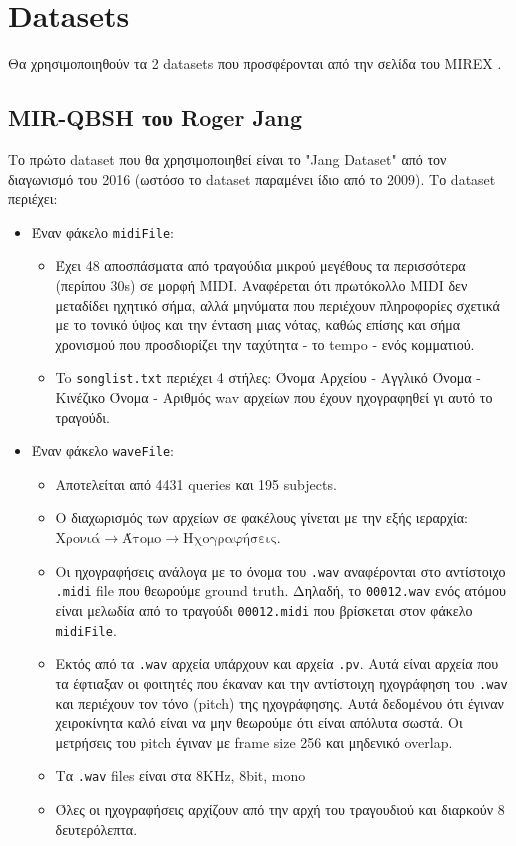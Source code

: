 \section{Datasets}

Θα χρησιμοποιηθούν τα 2 datasets που προσφέρονται από την σελίδα του MIREX \cite{mirex}.

\subsection{MIR-QBSH του Roger Jang}
Το πρώτο dataset που θα χρησιμοποιηθεί είναι το "Jang Dataset" \cite{jang-dataset} από τον διαγωνισμό του 2016 (ωστόσο το dataset παραμένει ίδιο από το 2009). Το dataset περιέχει:
\begin{itemize}
\item Έναν φάκελο \texttt{midiFile}:
\begin{itemize}
\item Έχει 48 αποσπάσματα από τραγούδια μικρού μεγέθους τα περισσότερα (περίπου 30s) σε μορφή MIDI\cite{midi1996complete}.
Αναφέρεται ότι πρωτόκολλο MIDI δεν μεταδίδει ηχητικό σήμα, αλλά μηνύματα που περιέχουν πληροφορίες σχετικά με το τονικό ύψος και την ένταση μιας νότας, καθώς επίσης και σήμα χρονισμού που προσδιορίζει την ταχύτητα - το tempo - ενός κομματιού.
\item To \texttt{songlist.txt} περιέχει 4 στήλες: Όνομα Αρχείου - Αγγλικό Όνομα - Κινέζικο Όνομα - Αριθμός wav αρχείων που έχουν ηχογραφηθεί γι αυτό το τραγούδι.
\end{itemize}

\item Έναν φάκελο \texttt{waveFile}:
\begin{itemize}
\item Αποτελείται από 4431 queries και 195 subjects.
\item Ο διαχωρισμός των αρχείων σε φακέλους γίνεται με την εξής ιεραρχία:
\(\text{Χρονιά} \rightarrow \text{Άτομο} \rightarrow \text{Ηχογραφήσεις}\).
\item Οι ηχογραφήσεις ανάλογα με το όνομα του \texttt{.wav} αναφέρονται στο αντίστοιχο \texttt{.midi} file που θεωρούμε ground truth.
Δηλαδή, το \texttt{00012.wav} ενός ατόμου είναι μελωδία από το τραγούδι \texttt{00012.midi} που βρίσκεται στον φάκελο \texttt{midiFile}.
\item Εκτός από τα \texttt{.wav} αρχεία υπάρχουν και αρχεία \texttt{.pv}.\label{item:pitch-vector}
Αυτά είναι αρχεία που τα έφτιαξαν οι φοιτητές που έκαναν και την αντίστοιχη
ηχογράφηση του \texttt{.wav} και περιέχουν τον τόνο (pitch) της ηχογράφησης. Αυτά δεδομένου ότι
έγιναν χειροκίνητα καλό είναι να μην θεωρούμε ότι είναι απόλυτα σωστά. Οι μετρήσεις του
pitch έγιναν με frame size 256 και μηδενικό overlap.
\item Τα \texttt{.wav} files είναι στα 8KHz, 8bit, mono
\item Όλες οι ηχογραφήσεις αρχίζουν από την αρχή του τραγουδιού και διαρκούν 8 δευτερόλεπτα.
\end{itemize}
\end{itemize}

